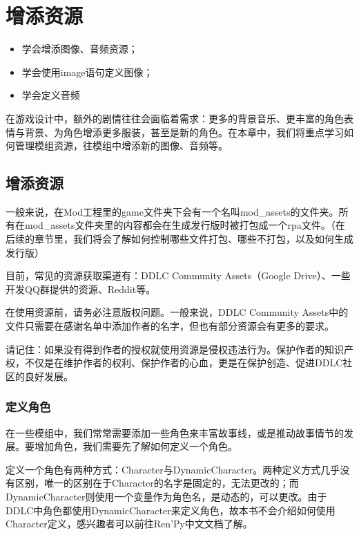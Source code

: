 \documentclass[../../Main.tex]{subfiles}
\begin{document}
\chapter{增添资源}
\label{4}
\begin{ChapterGoals}
    \begin{itemize}
        \item 学会增添图像、音频资源；
        \item 学会使用image语句定义图像；
        \item 学会定义音频
    \end{itemize}
\end{ChapterGoals}

在游戏设计中，额外的剧情往往会面临着需求：更多的背景音乐、更丰富的角色表情与背景、为角色增添更多服装，甚至是新的角色。在本章中，我们将重点学习如何管理模组资源，往模组中增添新的图像、音频等。

\section{增添资源}
一般来说，在Mod工程里的game文件夹下会有一个名叫mod\_assets的文件夹。所有在mod\_assets文件夹里的内容都会在生成发行版时被打包成一个rpa文件。（在后续的章节里，我们将会了解如何控制哪些文件打包、哪些不打包，以及如何生成发行版）

\begin{ExtraKnowledge}
    目前，常见的资源获取渠道有：DDLC Community Assets（Google Drive）、一些开发QQ群提供的资源、Reddit等。
\end{ExtraKnowledge}

\begin{Attention}
    在使用资源前，请务必注意版权问题。一般来说，DDLC Community Assets中的文件只需要在感谢名单中添加作者的名字，但也有部分资源会有更多的要求。
    
    请记住：如果没有得到作者的授权就使用资源是侵权违法行为。保护作者的知识产权，不仅是在维护作者的权利、保护作者的心血，更是在保护创造、促进DDLC社区的良好发展。
\end{Attention}


\subsection{定义角色}
在一些模组中，我们常常需要添加一些角色来丰富故事线，或是推动故事情节的发展。要增加角色，我们需要先了解如何定义一个角色。

定义一个角色有两种方式：Character与DynamicCharacter。两种定义方式几乎没有区别，唯一的区别在于Character的名字是固定的，无法更改的；而DynamicCharacter则使用一个变量作为角色名，是动态的，可以更改。由于DDLC中角色都使用DynamicCharacter来定义角色，故本书不会介绍如何使用Character定义，感兴趣者可以前往Ren'Py中文文档了解。
\end{document}
